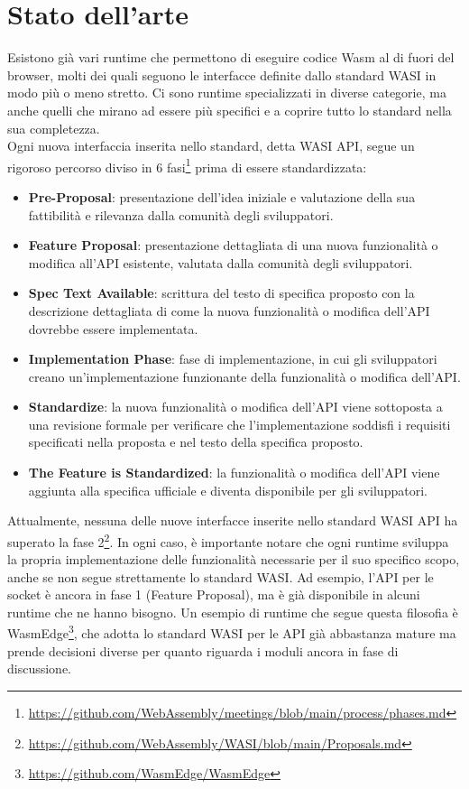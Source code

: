 \section{Stato dell'arte}
Esistono già vari runtime che permettono di eseguire codice Wasm al di fuori del browser, molti dei quali seguono le interfacce definite dallo standard WASI in modo più o meno stretto. Ci sono runtime specializzati in diverse categorie, ma anche quelli che mirano ad essere più specifici e a coprire tutto lo standard nella sua completezza.
\\
Ogni nuova interfaccia inserita nello standard, detta WASI API, segue un rigoroso percorso diviso in 6 fasi\footnote{\url{https://github.com/WebAssembly/meetings/blob/main/process/phases.md}} prima di essere standardizzata:
\begin{itemize}
    \item \textbf{Pre-Proposal}: presentazione dell'idea iniziale e valutazione della sua fattibilità e rilevanza dalla comunità degli sviluppatori.
    \item \textbf{Feature Proposal}: presentazione dettagliata di una nuova funzionalità o modifica all'API esistente, valutata dalla comunità degli sviluppatori.
    \item \textbf{Spec Text Available}: scrittura del testo di specifica proposto con la descrizione dettagliata di come la nuova funzionalità o modifica dell'API dovrebbe essere implementata.
    \item \textbf{Implementation Phase}: fase di implementazione, in cui gli sviluppatori creano un'implementazione funzionante della funzionalità o modifica dell'API.
    \item \textbf{Standardize}: la nuova funzionalità o modifica dell'API viene sottoposta a una revisione formale per verificare che l'implementazione soddisfi i requisiti specificati nella proposta e nel testo della specifica proposto.
    \item \textbf{The Feature is Standardized}: la funzionalità o modifica dell'API viene aggiunta alla specifica ufficiale e diventa disponibile per gli sviluppatori.
\end{itemize}


Attualmente, nessuna delle nuove interfacce inserite nello standard WASI API ha superato la fase 2\footnote{\url{https://github.com/WebAssembly/WASI/blob/main/Proposals.md}}.
In ogni caso, è importante notare che ogni runtime sviluppa la propria implementazione delle funzionalità necessarie per il suo specifico scopo, anche se non segue strettamente lo standard WASI. Ad esempio, l'API per le socket è ancora in fase 1 (Feature Proposal), ma è già disponibile in alcuni runtime che ne hanno bisogno. Un esempio di runtime che segue questa filosofia è WasmEdge\footnote{\url{https://github.com/WasmEdge/WasmEdge}}, che adotta lo standard WASI per le API già abbastanza mature ma prende decisioni diverse per quanto riguarda i moduli ancora in fase di discussione.


